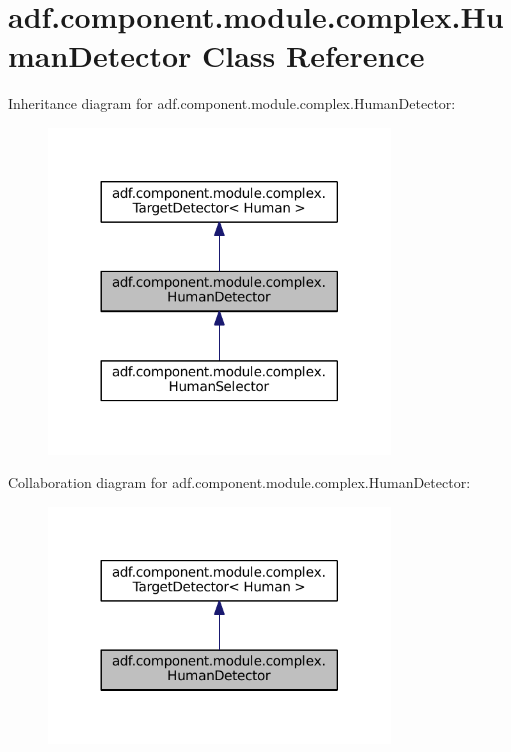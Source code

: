 \hypertarget{classadf_1_1component_1_1module_1_1complex_1_1HumanDetector}{}\section{adf.\+component.\+module.\+complex.\+Human\+Detector Class Reference}
\label{classadf_1_1component_1_1module_1_1complex_1_1HumanDetector}


Inheritance diagram for adf.\+component.\+module.\+complex.\+Human\+Detector\+:
\nopagebreak
\begin{figure}[H]
\begin{center}
\leavevmode
\includegraphics[width=257pt]{classadf_1_1component_1_1module_1_1complex_1_1HumanDetector__inherit__graph}
\end{center}
\end{figure}


Collaboration diagram for adf.\+component.\+module.\+complex.\+Human\+Detector\+:
\nopagebreak
\begin{figure}[H]
\begin{center}
\leavevmode
\includegraphics[width=257pt]{classadf_1_1component_1_1module_1_1complex_1_1HumanDetector__coll__graph}
\end{center}
\end{figure}
